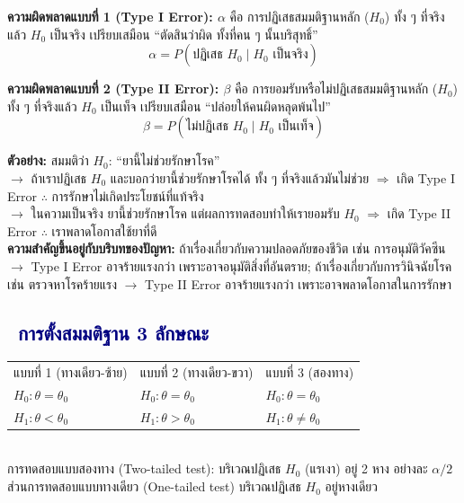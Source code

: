 \documentclass[10pt]{extarticle}
\newcommand{\dist}[1]{\subsection*{\textcolor{navy}{\textbullet\ #1}}}
\begin{document}
\textbf{ความผิดพลาดแบบที่ 1 (Type I Error): $\alpha$} คือ การปฏิเสธสมมติฐานหลัก ($H_0$) ทั้ง ๆ ที่จริงแล้ว $H_0$ เป็นจริง เปรียบเสมือน ``ตัดสินว่าผิด ทั้งที่คน ๆ นั้นบริสุทธิ์''
$$\alpha=P(\text{ปฏิเสธ }H_0\mid H_0\text{ เป็นจริง})$$

\textbf{ความผิดพลาดแบบที่ 2 (Type II Error): $\beta$} คือ การยอมรับหรือไม่ปฏิเสธสมมติฐานหลัก ($H_0$) ทั้ง ๆ ที่จริงแล้ว $H_0$ เป็นเท็จ เปรียบเสมือน ``ปล่อยให้คนผิดหลุดพ้นไป''
$$\beta=P(\text{ไม่ปฏิเสธ }H_0\mid H_0\text{ เป็นเท็จ})$$

\begin{ideabox}
\textbf{ตัวอย่าง:} สมมติว่า $H_0$: ``ยานี้ไม่ช่วยรักษาโรค''\\
$\to$ ถ้าเราปฏิเสธ $H_0$ และบอกว่ายานี้ช่วยรักษาโรคได้ ทั้ง ๆ ที่จริงแล้วมันไม่ช่วย $\Rightarrow$ เกิด Type I Error $\therefore$ การรักษาไม่เกิดประโยชน์ที่แท้จริง\\
$\to$ ในความเป็นจริง ยานี้ช่วยรักษาโรค แต่ผลการทดสอบทำให้เรายอมรับ $H_0$ $\Rightarrow$ เกิด Type II Error $\therefore$ เราพลาดโอกาสใช้ยาที่ดี\\[3pt]
\textbf{ความสำคัญขึ้นอยู่กับบริบทของปัญหา:} ถ้าเรื่องเกี่ยวกับความปลอดภัยของชีวิต เช่น การอนุมัติวัคซีน $\to$ Type I Error อาจร้ายแรงกว่า เพราะอาจอนุมัติสิ่งที่อันตราย; ถ้าเรื่องเกี่ยวกับการวินิจฉัยโรค เช่น ตรวจหาโรคร้ายแรง $\to$ Type II Error อาจร้ายแรงกว่า เพราะอาจพลาดโอกาสในการรักษา
\end{ideabox}

\dist{การตั้งสมมติฐาน 3 ลักษณะ}
\begin{center}
\small
\begin{tabular}{@{}lll@{}}
\rowcolor{lightbg}แบบที่ 1 (ทางเดียว-ซ้าย) & แบบที่ 2 (ทางเดียว-ขวา) & แบบที่ 3 (สองทาง)\\
$H_0:\theta=\theta_0$ & $H_0:\theta=\theta_0$ & $H_0:\theta=\theta_0$\\
$H_1:\theta<\theta_0$ & $H_1:\theta>\theta_0$ & $H_1:\theta\ne\theta_0$\\
\end{tabular}
\end{center}

\begin{center}
\\
{\footnotesize การทดสอบแบบสองทาง (Two-tailed test): บริเวณปฏิเสธ $H_0$ (แรเงา) อยู่ 2 หาง อย่างละ $\alpha/2$ ส่วนการทดสอบแบบทางเดียว (One-tailed test) บริเวณปฏิเสธ $H_0$ อยู่หางเดียว}
\end{center}
\end{document}
